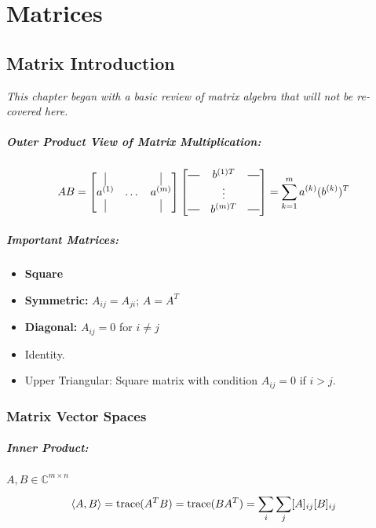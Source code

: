 \documentclass[a4paper,12pt]{report}
\DeclarePairedDelimiter\inpr{\langle}{\rangle}%
\newcommand*{\horzbar}{\rule[.5ex]{2.5ex}{0.5pt}}
\begin{document}
\chapter{Matrices}

\section{Matrix Introduction}

\textit{This chapter began with a basic review of matrix algebra that will not be re-covered here.} 

\paragraph{Outer Product View of Matrix Multiplication: } 

\begin{equation}
AB = 
\begin{bmatrix}
	\vrule & & \vrule \\
	a^{(1)} & \dots & a^{(m)} \\
	\vrule & & \vrule
\end{bmatrix}
\begin{bmatrix}
	\horzbar & b^{(1)T} & \horzbar \\
	 & \vdots & \\
	\horzbar & b^{(m)T} & \horzbar
\end{bmatrix} = 
\sum_{k=1}^{m} a^{(k)} (b^{(k)})^T
\end{equation}

\paragraph{Important Matrices: } 
\begin{itemize}
\item \textbf{Square}
\item \textbf{Symmetric: } $A_{ij} = A_{ji}$; $A = A^T$
\item \textbf{Diagonal: } $A_{ij} = 0$ for $i \neq j$
\item Identity.
\item Upper Triangular: Square matrix with condition $A_{ij} = 0$ if $i > j$.
\end{itemize}

\subsection{Matrix Vector Spaces}

\paragraph{Inner Product: } $A, B \in \mathbb{C}^{m\times n}$ 
\begin{equation}
	\inpr{A, B} = \text{trace}(A^T B) = \text{trace}(BA^T) = \sum_{i}^{} \sum_{j}^{} [A]_{ij} [B]_{ij}
\end{equation}
\end{document}
